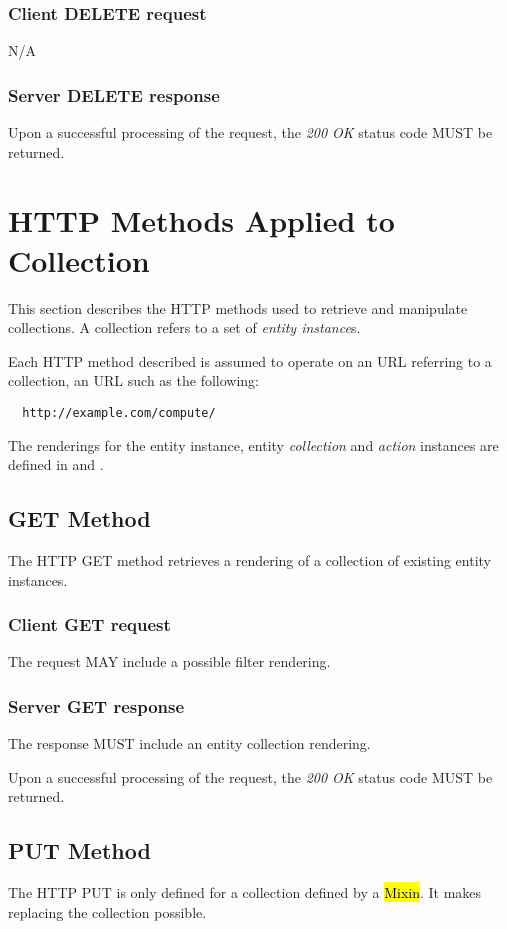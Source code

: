 \documentclass[10pt,a4paper]{article}
\begin{document}
\subsubsection*{Client DELETE request}
N/A

\subsubsection*{Server DELETE response}
Upon a successful processing of the request, the \emph{200 OK} status code MUST be returned.

\section{HTTP Methods Applied to Collection}
\label{sec:http_methods_coll}

This section describes the HTTP methods used to retrieve and manipulate
collections. A collection refers to a set of {\em entity instance}s.

Each HTTP method described is assumed to operate
on an URL referring to a collection, an URL such as the following:
\begin{verbatim}
  http://example.com/compute/
\end{verbatim}

The renderings for the entity instance, entity {\em collection} and {\em action}
instances are defined in \cite{occi:text} and \cite{occi:json}.

\subsection{GET Method}
The HTTP GET method retrieves a rendering of a collection of existing entity instances.

\subsubsection*{Client GET request}
The request MAY include a possible filter rendering.

\subsubsection*{Server GET response}
The response MUST include an entity collection rendering.

Upon a successful processing of the request, the \emph{200 OK} status code MUST be returned.

\subsection{PUT Method}
The HTTP PUT is only defined for a collection defined by a \hl{Mixin}. It makes replacing the collection possible.
\end{document}
